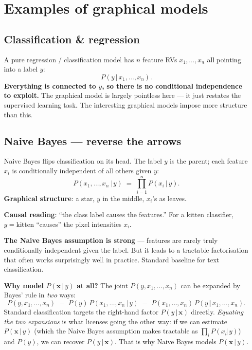 \documentclass[11pt, a4paper]{article}
\begin{document}
\section{Examples of graphical models}

\subsection{Classification \& regression}

A pure regression / classification model has $n$ feature RVs $x_1, \ldots, x_n$ all pointing into a label $y$:
\[
P(y\,|\,x_1, \ldots, x_n).
\]
\textbf{Everything is connected to $y$, so there is no conditional independence to exploit.} The graphical model is largely pointless here — it just restates the supervised learning task. The interesting graphical models impose more structure than this.

\subsection{Naive Bayes — reverse the arrows}

Naive Bayes flips classification on its head. The label $y$ is the parent; each feature $x_i$ is conditionally independent of all others given $y$:
\[
P(x_1, \ldots, x_n\,|\,y) \;=\; \prod_{i=1}^n P(x_i\,|\,y).
\]
\textbf{Graphical structure}: a star, $y$ in the middle, $x_i$'s as leaves.

\textbf{Causal reading}: ``the class label causes the features.'' For a kitten classifier, $y = \text{kitten}$ ``causes'' the pixel intensities $x_i$.

\textbf{The Naive Bayes assumption is strong} — features are rarely truly conditionally independent given the label. But it leads to a tractable factorisation that often works surprisingly well in practice. Standard baseline for text classification.

\textbf{Why model $P(\mathbf{x}\,|\,y)$ at all?} The joint $P(y, x_1, \ldots, x_n)$ can be expanded by Bayes' rule in \emph{two} ways:
\[
P(y, x_1, \ldots, x_n) \;=\; P(y)\,P(x_1, \ldots, x_n\,|\,y) \;=\; P(x_1, \ldots, x_n)\,P(y\,|\,x_1, \ldots, x_n).
\]
Standard classification targets the right-hand factor $P(y\,|\,\mathbf{x})$ directly. \emph{Equating the two expansions} is what licenses going the other way: if we can estimate $P(\mathbf{x}\,|\,y)$ (which the Naive Bayes assumption makes tractable as $\prod_i P(x_i|y)$) and $P(y)$, we can recover $P(y\,|\,\mathbf{x})$. That is why Naive Bayes models $P(\mathbf{x}\,|\,y)$.
\end{document}
